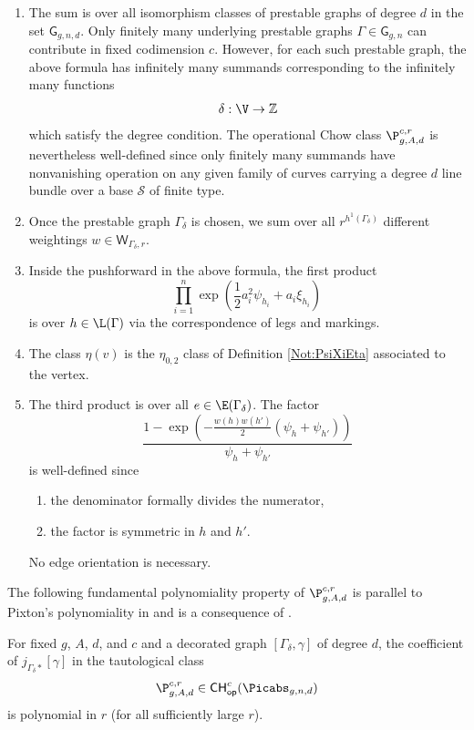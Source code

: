 \begin{enumerate}
    \item[(i)]
    The sum is over all isomorphism classes of prestable graphs of degree $d$ in the
    set $\mathsf{G}_{g,n,d}$.
    Only finitely many underlying prestable graphs $\Gamma\in \mathsf{G}_{g,n}$ can
    contribute in fixed codimension $c$. However, for each such prestable graph, the above formula
    has infinitely many summands corresponding to the infinitely many functions
    $$\delta: \V \rightarrow \mathbb{Z}$$
    which satisfy the degree condition.
    The operational Chow class $\P_{g,A,d}^{c,r}$ is nevertheless well-defined since
      only finitely many summands have nonvanishing operation on any given family of curves
       carrying a degree $d$ line bundle over a base $\mathcal{S}$ of finite type.
    \item[(ii)]
    Once the prestable graph $\Gamma_\delta$ is chosen, we sum over all $r^{h^1(\Gamma_\delta)}$ different
    weightings $w\in \mathsf{W}_{\Gamma_\delta,r}$.
    \item[(iii)]
Inside the pushforward in the above formula, the first product
$$\prod_{i=1}^n \exp\left(\frac{1}{2}a_i^2 \psi_{h_i}+a_i \xi_{h_i}\right)\, $$
is over $h\in \L(\Gamma)$
via the correspondence of legs and markings.
\item[(iv)]The class $\eta(v)$ is the $\eta_{0,2}$ class
of Definition \ref{Not:PsiXiEta} associated to the vertex.
\item[(v)]
The third product is over all $e\in \E(\Gamma_\delta)$.
The factor
$$\frac{1-\exp\left(-\frac{w(h)w(h')}{2}(\psi_h+\psi_{h'})\right)}{\psi_h + \psi_{h'}}$$
is well-defined since
\begin{enumerate}
\item[$\bullet$]
the denominator formally divides
the numerator,
\item[$\bullet$] the factor is symmetric in $h$ and $h'$.
\end{enumerate}
No edge orientation is necessary.
\end{enumerate}

The following fundamental polynomiality property of $\P_{g,A,d}^{c,r}$
 is
parallel to Pixton's polynomiality in \cite[Appendix]{Janda2016Double-ramifica} and
is a consequence of \cite[Proposition $3''$]{Janda2016Double-ramifica}.

\begin{proposition}
\notready \label{pply} For fixed $g$, $A$, $d$, and $c$ and a decorated graph $[\Gamma_\delta, \gamma]$ of
degree $d$, the coefficient of $j_{\Gamma_\delta*} [\gamma]$ in the
tautological class
$$\P_{g,A,d}^{c,r} \in \mathsf{CH}^c_{\mathsf{op}}(\Picabs_{g,n,d})$$
is polynomial in $r$ (for all sufficiently large $r$).
\end{proposition}

